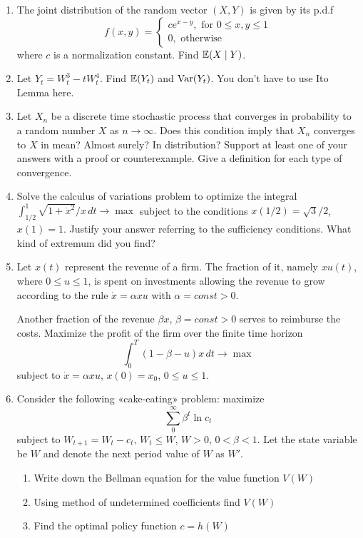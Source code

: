\documentclass[12pt, a4paper]{article}
\begin{document}
\begin{enumerate}
\item  The joint distribution of the random vector $(X,Y)$ is given by its p.d.f
\[
f(x,y)=
\left\{
  \begin{array}{l}
    c e^{x-y}, \text{ for } 0\leq x,y\leq 1 \\
    0, \text{ otherwise}
  \end{array}
\right.
\]
where $c$ is a normalization constant. Find $\mathbb{E}(X\mid Y)$.

\item Let $Y_t=W_t^3-tW_t^4$. Find $\mathbb{E}(Y_t)$ and $\operatorname{Var}(Y_t)$.  You don’t have to use Ito Lemma here.
\item Let $X_n$ be a discrete time stochastic process that converges in probability to a random number $X$ as $n\to \infty$. Does this condition imply that $X_n$ converges to $X$ in mean? Almost surely? In distribution? Support at least one of your answers with a proof or counterexample. Give a definition for each type of convergence.

\item Solve the calculus of variations problem to optimize the integral
$ \int_{1/2}^1 \sqrt{1+\dot{x}^2}/x\,dt \to \max $
subject to the conditions $x(1/2)=\sqrt{3}/2$, $x(1)=1$. Justify your answer referring to the sufficiency conditions. What kind of extremum did you find?

\item Let $x(t)$ represent the revenue of a firm. The fraction of it, namely $xu(t)$, where $0\leq u\leq 1$, is spent on investments allowing the revenue to grow according to the rule $\dot{x}=\alpha x u$ with $\alpha=const>0$.

Another fraction of the revenue $\beta x$, $\beta=const>0$ serves to reimburse the costs. Maximize the profit of the firm over the finite time horizon
\[
\int_0^T (1-\beta-u)x\, dt \to \max
\]
subject to $\dot{x}=\alpha x u$, $x(0)=x_0$, $0\leq u\leq 1$.

\item Consider the following «cake-eating» problem: maximize
\[
\sum_0^{\infty} \beta^t \ln c_t
\]
subject to $W_{t+1}=W_t-c_t$, $W_t\leq W$, $W>0$, $0<\beta<1$. Let the state variable be $W$ and denote the next period value of $W$ as $W'$.
\begin{enumerate}
\item Write down the Bellman equation for the value function $V(W)$
\item Using method of undetermined coefficients find $V(W)$
\item Find the optimal policy function $c=h(W)$
\end{enumerate}

\end{enumerate}
\end{document}
